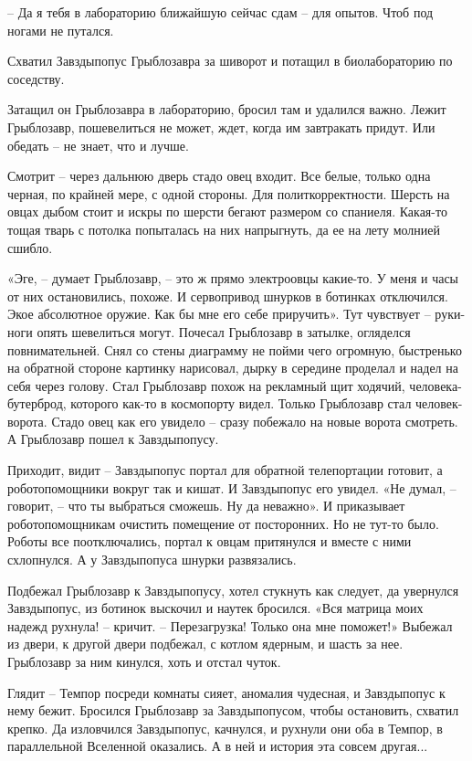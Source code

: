 \documentclass[ebook,oneside,final,openright]{memoir}
\begin{document}
– Да я тебя в лабораторию ближайшую сейчас сдам – для опытов. Чтоб под ногами не путался.\par
Схватил Завздыпопус Грыблозавра за шиворот и потащил в биолабораторию по соседству.\par
\par
Затащил он Грыблозавра в лабораторию, бросил там и удалился важно. Лежит Грыблозавр, пошевелиться не может, ждет, когда им завтракать придут. Или обедать – не знает, что и лучше. \par
Смотрит – через дальнюю дверь стадо овец входит. Все белые, только одна черная, по крайней мере, с одной стороны. Для политкорректности. Шерсть на овцах дыбом стоит и искры по шерсти бегают размером со спаниеля. Какая-то тощая тварь с потолка попыталась на них напрыгнуть, да ее на лету молнией сшибло.\par
\par
«Эге, – думает Грыблозавр, – это ж прямо электроовцы какие-то. У меня и часы от них остановились, похоже. И сервопривод шнурков в ботинках отключился. Экое абсолютное оружие. Как бы мне его себе приручить». Тут чувствует – руки-ноги опять шевелиться могут. Почесал Грыблозавр в затылке, огляделся повнимательней. Снял со стены диаграмму не пойми чего огромную, быстренько на обратной стороне картинку нарисовал, дырку в середине проделал и надел на себя через голову. Стал Грыблозавр похож на рекламный щит ходячий, человека-бутерброд, которого как-то в космопорту видел. Только Грыблозавр стал человек-ворота. Стадо овец как его увидело – сразу побежало на новые ворота смотреть. А Грыблозавр пошел к Завздыпопусу.\par
\par
Приходит, видит – Завздыпопус портал для обратной телепортации готовит, а роботопомощники вокруг так и кишат. И Завздыпопус его увидел. «Не думал, – говорит, – что ты выбраться сможешь. Ну да неважно». И приказывает роботопомощникам очистить помещение от посторонних. Но не тут-то было. Роботы все поотключались, портал к овцам притянулся и вместе с ними схлопнулся. А у Завздыпопуса шнурки развязались.\par
\par
Подбежал Грыблозавр к Завздыпопусу, хотел стукнуть как следует, да увернулся Завздыпопус, из ботинок выскочил и наутек бросился. «Вся матрица моих надежд рухнула! – кричит. – Перезагрузка! Только она мне поможет!» Выбежал из двери, к другой двери подбежал, с котлом ядерным, и шасть за нее. Грыблозавр за ним кинулся, хоть и отстал чуток.\par
\par
Глядит – Темпор посреди комнаты сияет, аномалия чудесная, и Завздыпопус к нему бежит. Бросился Грыблозавр за Завздыпопусом, чтобы остановить, схватил крепко. Да изловчился Завздыпопус, качнулся, и рухнули они оба в Темпор, в параллельной Вселенной оказались. А в ней и история эта совсем другая...\par
\end{document}
